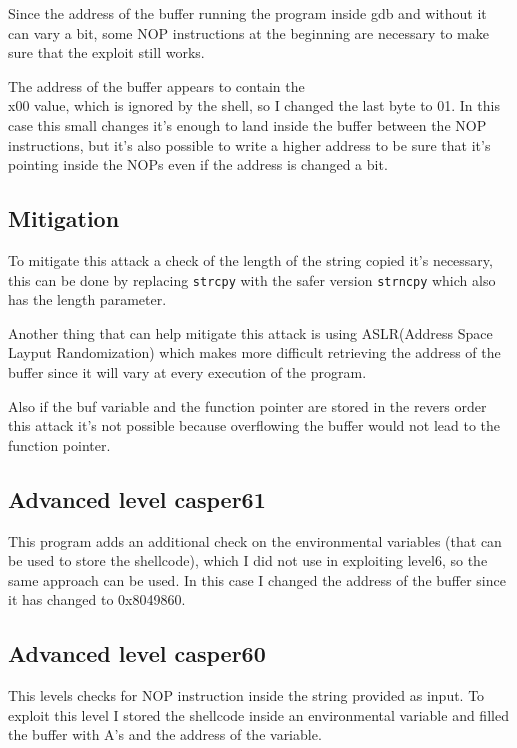 \documentclass[a4paper,12pt]{article}
\begin{document}
Since the address of the buffer running the program inside gdb and without it can vary a bit, some NOP instructions at the beginning are necessary to make sure that the exploit still works.

The address of the buffer appears to contain the \\x00 value, which is ignored by the shell, so I changed the last byte to 01. In this case this small changes it's enough to land inside the buffer between the NOP instructions, but it's also possible to write a higher address to be sure that it's pointing inside the NOPs even if the address is changed a bit.  

\subsection{Mitigation}

To mitigate this attack a check of the length of the string copied it's necessary, this can be done by replacing \texttt{strcpy} with the safer version \texttt{strncpy} which also has the length parameter.

Another thing that can help mitigate this attack is using ASLR(Address Space Layput Randomization)
which makes more difficult retrieving the address of the buffer since it will vary at every execution of the program.

Also if the buf variable and the function pointer are stored in the revers order this attack it's not possible because overflowing the buffer would not lead to the function pointer.

\subsection{Advanced level casper61}

This program adds an additional check on the environmental variables (that can be used to store the shellcode), which I did not use in exploiting level6, so the same approach can be used. In this case I changed the address of the buffer since it has changed to 0x8049860.

\subsection{Advanced level casper60}

This levels checks for NOP instruction inside the string provided as input. To exploit this level I stored the shellcode inside an environmental variable and filled the buffer with A's and the address of the variable.
\end{document}
